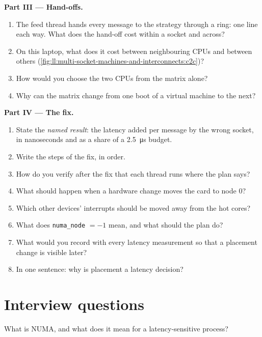 \begin{problem}
\medskip\noindent\textbf{Part III --- Hand-offs.}
\begin{enumerate}[resume]
\item The feed thread hands every message to the strategy through a ring: one line each way. What does the hand-off cost
within a socket and across?
\item On this laptop, what does it cost between neighbouring CPUs and between others (\cref{fig:ll:multi-socket-machines-and-interconnects:c2c})?
\item How would you choose the two CPUs from the matrix alone?
\item Why can the matrix change from one boot of a virtual machine to the next?
\end{enumerate}

\medskip\noindent\textbf{Part IV --- The fix.}
\begin{enumerate}[resume]
\item State the \emph{named result}: the latency added per message by the wrong socket, in nanoseconds and as a share of
a \qty{2.5}{\micro\second} budget.
\item Write the steps of the fix, in order.
\item How do you verify after the fix that each thread runs where the plan says?
\item What should happen when a hardware change moves the card to node 0?
\item Which other devices' interrupts should be moved away from the hot cores?
\item What does \texttt{numa\_node} $= -1$ mean, and what should the plan do?
\item What would you record with every latency measurement so that a placement change is visible later?
\item In one sentence: why is placement a latency decision?
\end{enumerate}
\end{problem}

\section{Interview questions}

\begin{interviewq}\label{iq:ll:multi-socket-machines-and-interconnects:1}
What is NUMA, and what does it mean for a latency-sensitive process?
\end{interviewq}

